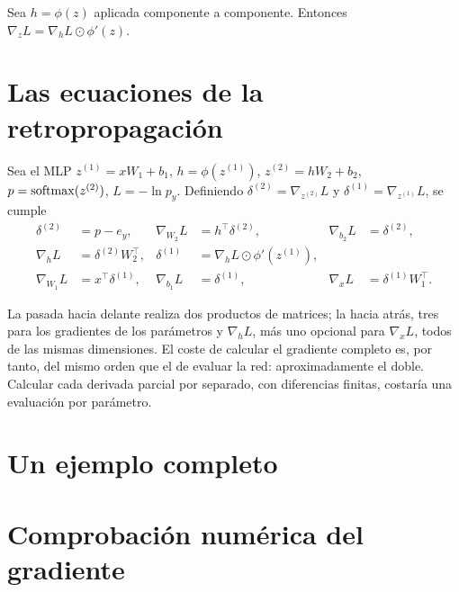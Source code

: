 \begin{proposicion}\label{prop:activacion}
Sea $h=\phi(z)$ aplicada componente a componente. Entonces $\nabla_{\!z}L=\nabla_{\!h}L\odot\phi'(z)$.
\end{proposicion}

\section{Las ecuaciones de la retropropagación}

\begin{teorema}\label{teo:backprop}
Sea el MLP $z^{(1)}=xW_1+b_1$, $h=\phi(z^{(1)})$, $z^{(2)}=hW_2+b_2$, $p=\operatorname{softmax}(z^{(2)})$, $L=-\ln p_y$. Definiendo $\delta^{(2)}=\nabla_{z^{(2)}}L$ y $\delta^{(1)}=\nabla_{z^{(1)}}L$, se cumple
\[
\begin{aligned}
\delta^{(2)}&=p-e_y, & \nabla_{\!W_2}L&=h^{\top}\delta^{(2)}, & \nabla_{\!b_2}L&=\delta^{(2)},\\
\nabla_{\!h}L&=\delta^{(2)}W_2^{\top}, & \delta^{(1)}&=\nabla_{\!h}L\odot\phi'(z^{(1)}), & & \\
\nabla_{\!W_1}L&=x^{\top}\delta^{(1)}, & \nabla_{\!b_1}L&=\delta^{(1)}, & \nabla_{\!x}L&=\delta^{(1)}W_1^{\top}.
\end{aligned}
\]
\end{teorema}

\addtocounter{figure}{1}%

\begin{observacion}[Coste]
La pasada hacia delante realiza dos productos de matrices; la hacia atrás, tres para los gradientes de los parámetros y $\nabla_hL$, más uno opcional para $\nabla_xL$, todos de las mismas dimensiones. El coste de calcular el gradiente completo es, por tanto, del mismo orden que el de evaluar la red: aproximadamente el doble. Calcular cada derivada parcial por separado, con diferencias finitas, costaría una evaluación por parámetro.
\end{observacion}

\section{Un ejemplo completo}

\addtocounter{definicion}{1}%

\section{Comprobación numérica del gradiente}

